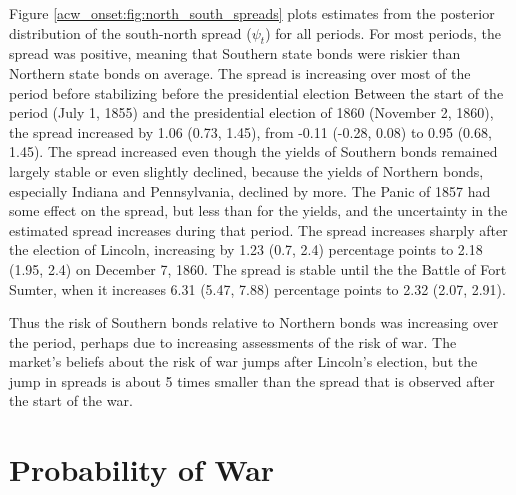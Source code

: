 Figure \ref{acw_onset:fig:north_south_spreads} plots estimates from the posterior distribution of the south-north spread ($\psi_{t}$) for all periods.
For most periods, the spread was positive, meaning that Southern state bonds were riskier than Northern state bonds on average.
The spread is increasing over most of the period before stabilizing before the presidential election
Between the start of the period (July 1, 1855) and the presidential election of 1860 (November 2, 1860), the spread increased by 1.06 (0.73, 1.45),
from -0.11 (-0.28, 0.08) to 0.95 (0.68, 1.45).
The spread increased even though the yields of Southern bonds remained largely stable or even slightly declined, because the yields of Northern bonds, especially Indiana and Pennsylvania, declined by more.
The Panic of 1857 had some effect on the spread, but less than for the yields, and the uncertainty in the estimated spread increases during that period.
The spread increases sharply after the election of Lincoln, increasing by 1.23 (0.7, 2.4) percentage points to 2.18 (1.95, 2.4) on December 7, 1860.
The spread is stable until the the Battle of Fort Sumter, when it increases 6.31 (5.47, 7.88) percentage points to 2.32 (2.07, 2.91).

Thus the risk of Southern bonds relative to Northern bonds was increasing over the period, perhaps due to increasing assessments of the risk of war.
The market's beliefs about the risk of war jumps after Lincoln's election, but the jump in spreads is about 5 times smaller than the spread that is observed after the start of the war.

\section{Probability of War}
\label{acw_onset:sec:probability-war}


